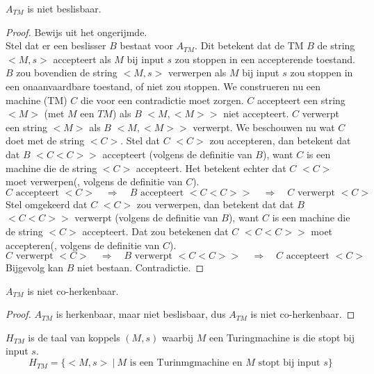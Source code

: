 \documentclass[main.tex]{subfiles}
\begin{document}
\begin{st}
  \label{gev:a-tm-niet-besl}
  $A_{TM}$ is niet beslisbaar.

  \begin{proof}
    Bewijs uit het ongerijmde.\\
    Stel dat er een beslisser $B$ bestaat voor $A_{TM}$.
    Dit betekent dat de TM $B$ de string $<M,s>$ accepteert als $M$ bij input $s$ zou stoppen in een accepterende toestand.
    $B$ zou bovendien de string $<M,s>$ verwerpen als $M$ bij input $s$ zou stoppen in een onaanvaardbare toestand, of niet zou stoppen.
    We construeren nu een machine (TM) $C$ die voor een contradictie moet zorgen.
    $C$ accepteert een string $<M>$ (met $M$ een $TM$) als $B$ $<M,<M>>$ niet accepteert.
    $C$ verwerpt een string $<M>$ als $B$ $<M,<M>>$ verwerpt.
    We beschouwen nu wat $C$ doet met de string $<C>$.
    Stel dat $C$ $<C>$ zou accepteren, dan betekent dat dat $B$ $<C<C>>$ accepteert (volgens de definitie van $B$), want $C$ is een machine die de string $<C>$ accepteert.
    Het betekent echter dat $C$ $<C>$ moet verwerpen(, volgens de definitie van $C$).
    \[ C \text{ accepteert } <C> \quad\Rightarrow\quad B \text{ accepteert } <C<C>> \quad\Rightarrow\quad C \text{ verwerpt } <C> \]
    Stel omgekeerd dat $C$ $<C>$ zou verwerpen, dan betekent dat dat $B$ $<C<C>>$ verwerpt (volgens de definitie van $B$), want $C$ is een machine die de string $<C>$ accepteert.
    Dat zou betekenen dat $C$ $<C<C>>$ moet accepteren(, volgens de definitie van $C$).
    \[ C \text{ verwerpt } <C> \quad\Rightarrow\quad B \text{ verwerpt } <C<C>> \quad\Rightarrow\quad C \text{ accepteert } <C> \]
    Bijgevolg kan $B$ niet bestaan.
    Contradictie.
  \end{proof}
\end{st}

\begin{gev}
  \label{gev:a-tm-niet-coherk}
  $A_{TM}$ is niet co-herkenbaar.
  \begin{proof}
    $A_{TM}$ is herkenbaar, maar niet beslisbaar, dus $A_{TM}$ is niet co-herkenbaar.
  \end{proof}
\end{gev}


\begin{de}
  \label{de:h-tm}
  $H_{TM}$ is de taal van koppels $(M,s)$ waarbij $M$ een Turingmachine is die stopt bij input $s$.
  \[ H_{TM} = \{ <M,s> \ |\ M \text{ is een Turinmgmachine en } M \text{ stopt bij input } s \} \]
\end{de}
\end{document}
